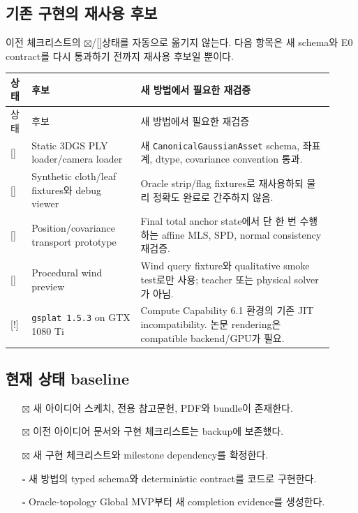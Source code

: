 \documentclass[10pt,a4paper]{article}
\newcommand{\todo}{\textcolor{TodoGray}{\(\square\)}}
\newcommand{\progress}{\textcolor{ProgressBlue}{[{\raisebox{0.1ex}{\(\sim\)}}]}}
\newcommand{\done}{\textcolor{DoneGreen}{\(\boxtimes\)}}
\newcommand{\blocked}{\textcolor{BlockRed}{[!]}}
\newcommand{\code}[1]{\texttt{#1}}
\begin{document}
\subsection{기존 구현의 재사용 후보}

이전 체크리스트의 \done/\progress 상태를 자동으로 옮기지 않는다.
다음 항목은 새 schema와 E0 contract를 다시 통과하기 전까지 재사용 후보일 뿐이다.

\begin{longtable}{L{0.06\linewidth}L{0.31\linewidth}L{0.55\linewidth}}
\toprule
상태 & 후보 & 새 방법에서 필요한 재검증 \\
\midrule
\endfirsthead
\toprule
상태 & 후보 & 새 방법에서 필요한 재검증 \\
\midrule
\endhead
\progress & Static 3DGS PLY loader/camera loader & 새 \code{CanonicalGaussianAsset} schema, 좌표계, dtype, covariance convention 통과. \\
\progress & Synthetic cloth/leaf fixtures와 debug viewer & Oracle strip/flag fixtures로 재사용하되 물리 정확도 완료로 간주하지 않음. \\
\progress & Position/covariance transport prototype & Final total anchor state에서 단 한 번 수행하는 affine MLS, SPD, normal consistency 재검증. \\
\progress & Procedural wind preview & Wind query fixture와 qualitative smoke test로만 사용; teacher 또는 physical solver가 아님. \\
\blocked & \code{gsplat 1.5.3} on GTX 1080 Ti & Compute Capability 6.1 환경의 기존 JIT incompatibility. 논문 rendering은 compatible backend/GPU가 필요. \\
\bottomrule
\end{longtable}

\subsection{현재 상태 baseline}

\begin{itemize}
  \item[\done] 새 아이디어 스케치, 전용 참고문헌, PDF와 bundle이 존재한다.
  \item[\done] 이전 아이디어 문서와 구현 체크리스트는 backup에 보존했다.
  \item[\done] 새 구현 체크리스트와 milestone dependency를 확정한다.
  \item[\todo] 새 방법의 typed schema와 deterministic contract를 코드로 구현한다.
  \item[\todo] Oracle-topology Global MVP부터 새 completion evidence를 생성한다.
\end{itemize}
\end{document}
